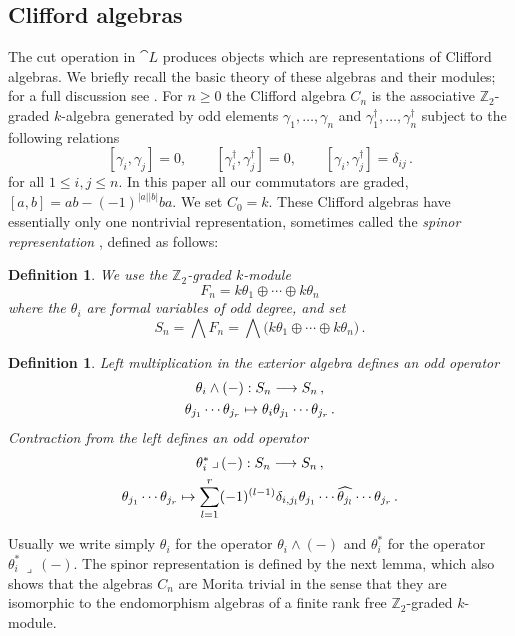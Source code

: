 \documentclass[english,letter paper,12pt,leqno]{article}
\theoremstyle{example}
\newtheorem{definition}[theorem]{Definition}
\numberwithin{equation}{section}
\def\be{\begin{equation}}
\def\ee{\end{equation}}
\def\nZ{\mathds{Z}}
\begin{document}
\subsection{Clifford algebras}\label{section:clifford_algs}

The cut operation in $\cat{L}$ produces objects which are representations of Clifford algebras. We briefly recall the basic theory of these algebras and their modules; for a full discussion see \cite{friedrich}. For $n \ge 0$ the Clifford algebra $C_n$ is the associative $\mathbb{Z}_2$-graded $k$-algebra generated by odd elements $\gamma_1,\ldots,\gamma_n$ and $\gamma_1^\dagger, \ldots, \gamma_n^\dagger$ subject to the following relations
\be\label{eq:clifford_relations}
[\gamma_i, \gamma_j] = 0, \qquad [\gamma_i^\dagger, \gamma_j^\dagger] = 0, \qquad [\gamma_i, \gamma_j^\dagger] = \delta_{ij}\,.
\ee
for all $1 \le i, j \le n$. In this paper all our commutators are graded, $[a,b] = ab - (-1)^{|a||b|} ba$. We set $C_0 = k$. These Clifford algebras have essentially only one nontrivial representation, sometimes called the \emph{spinor representation} \cite[p.14]{friedrich}, defined as follows:

\begin{definition} We use the $\nZ_2$-graded $k$-module
\be
F_n = k \theta_1 \oplus \cdots \oplus k \theta_n
\ee
where the $\theta_i$ are formal variables of odd degree, and set
\be
S_n = \bigwedge F_n = \bigwedge\big( k \theta_1 \oplus \cdots \oplus k \theta_n \big)\,.
\ee
\end{definition}

\begin{definition}\label{defn:contraction} Left multiplication in the exterior algebra defines an odd operator
\begin{gather*}
\theta_i \wedge (-): S_n \longrightarrow S_n\,,\\
\theta_{j_1} \cdots \theta_{j_r} \mapsto \theta_i \theta_{j_1} \cdots \theta_{j_r}\,.
\end{gather*}
Contraction from the left defines an odd operator
\begin{gather*}
\theta_i^*\, \lrcorner\, (-): S_n \longrightarrow S_n\,,\\
\theta_{j_1} \cdots \theta_{j_r} \mapsto \sum_{l=1}^r (-1)^{(l-1)} \delta_{i,j_l} \theta_{j_1} \cdots \widehat{ \theta_{j_l} } \cdots \theta_{j_r}\,.
\end{gather*}
\end{definition}

Usually we write simply $\theta_i$ for the operator $\theta_i \wedge (-)$ and $\theta_i^*$ for the operator $\theta_i^*\, \lrcorner\, (-)$. The spinor representation is defined by the next lemma, which also shows that the algebras $C_n$ are Morita trivial in the sense that they are isomorphic to the endomorphism algebras of a finite rank free $\mathbb{Z}_2$-graded $k$-module.
\end{document}
